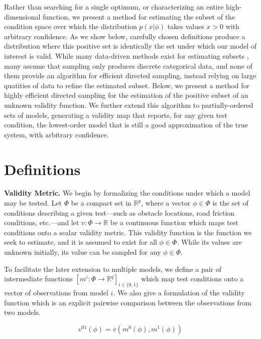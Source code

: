 \documentclass{amsart}
\begin{document}
Rather than searching for a single optimum, or characterizing an entire high-dimensional function, we present a method for estimating the subset of the condition space over which the distribution $p(x|\phi)$ takes values $x>0$ with arbitrary confidence. As we show below, carefully chosen definitions produce a distribution where this positive set is identically the set under which our model of interest is valid. While many data-driven methods exist for estimating subsets \cite{ahmed03} \cite{boser92}\cite{gibbs00}, many assume that sampling only produces discrete categorical data, and none of them provide an algorithm for efficient directed sampling, instead relying on large quatities of data to refine the estimated subset. Below, we present a method for highly efficient directed sampling for the estimation of the positive subset of an unknown validity function. We further extend this algorithm to partially-ordered sets of models, generating a validity map that reports, for any given test condition, the lowest-order model that is still a good approximation of the true system, with arbitrary confidence.

\section{Definitions}
\noindent\textbf{Validity Metric.} We begin by formalizing the conditions under which a model may be tested. Let $\Phi$ be a compact set in $\mathbb{R}^p$, where a vector $\phi\in\Phi$ is the set of conditions describing a given test---such as obstacle locations, road friction conditions, etc.---and let $v:\Phi\rightarrow\mathbb{R}$ be a continuous function which maps test conditions onto a scalar validity metric. This validity function is the function we seek to estimate, and it is assumed to exist for all $\phi\in\Phi$. While its values are unknown initially, its value can be sampled for any $\phi\in\Phi$.

To facilitate the later extension to multiple models, we define a pair of intermediate functions $[m^i:\Phi\rightarrow\mathbb{R}^q]_{i\in\{0,1\}}$ which map test conditions onto a vector of observations from model $i$. We also give a formulation of the validity function which is an explicit pairwise comparison between the observations from two models.

\begin{equation}
    v^{01}(\phi) = v(m^0(\phi), m^1(\phi))
    \label{eq:valorig}
\end{equation}
\smallskip
\end{document}
